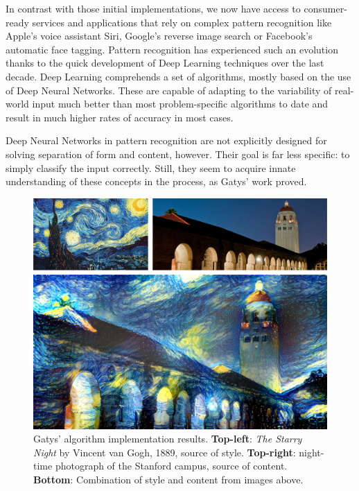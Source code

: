 In contrast with those initial implementations, we now have access to consumer-ready services and applications that rely on complex pattern recognition like Apple's voice assistant Siri, Google's reverse image search or Facebook's automatic face tagging.
Pattern recognition has experienced such an evolution thanks to the quick development of Deep Learning techniques over the last decade.
Deep Learning comprehends a set of algorithms, mostly based on the use of Deep Neural Networks.
These are capable of adapting to the variability of real-world input much better than most problem-specific algorithms to date and result in much higher rates of accuracy in most cases.

Deep Neural Networks in pattern recognition are not explicitly designed for solving separation of form and content, however.
Their goal is far less specific: to simply classify the input correctly.
Still, they seem to acquire innate understanding of these concepts in the process, as Gatys' work \cite{Gatys2015} proved.

\begin{figure}[htb]
  \includegraphics[width=\textwidth]{gfx/neural-style-composed}
  \caption{Gatys' algorithm implementation \cite{Johnson2015} results. \textbf{Top-left}: \textit{The Starry Night} by Vincent van Gogh, 1889, source of style. \textbf{Top-right}: night-time photograph of the Stanford campus, source of content. \textbf{Bottom}: Combination of style and content from images above.}
  \label{fig:sec:intro:neural-style}
\end{figure}

